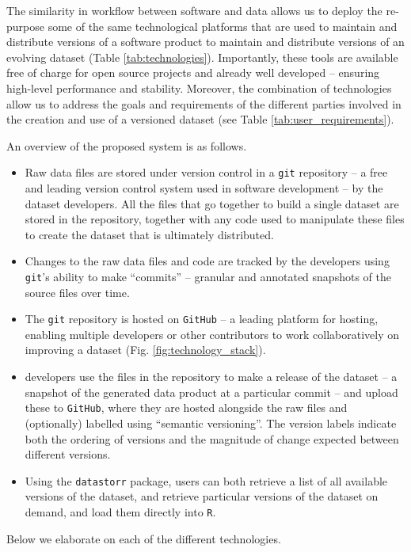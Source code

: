 \documentclass[a4paper,num-refs]{assets/oup-contemporary}
\begin{document}
The similarity in workflow between software and data allows us to deploy the re-purpose some of the same technological platforms that are used to maintain and distribute versions of a software product to maintain and distribute versions of an evolving dataset (Table \ref{tab:technologies}). Importantly, these tools are available free of charge for open source projects and already well developed -- ensuring high-level performance and stability. Moreover, the combination of technologies allow us to address the goals and requirements of the different parties involved in the creation and use of a versioned dataset (see Table \ref{tab:user_requirements}). 

An overview of the proposed system is as follows.
\begin{itemize}
  \item Raw data files are stored under version control in a \texttt{git} repository --  a free and leading version control system used in software development -- by the dataset developers. All the files that go together to build a single dataset are stored in the repository, together with any code used to manipulate these files to create the dataset that is ultimately distributed.
  \item Changes to the raw data files and code are tracked by the developers using  \texttt{git}'s ability to make ``commits'' -- granular and annotated snapshots of the source files over time.
  \item The \texttt{git} repository is hosted on \texttt{GitHub} -- a leading platform for hosting, enabling multiple developers or other contributors to work collaboratively on improving a dataset (Fig. \ref{fig:technology_stack}).
  \item developers use the files in the repository to make a release of the dataset -- a snapshot of the generated data product at a particular commit -- and upload these to \texttt{GitHub}, where they are hosted alongside the raw files and (optionally) labelled using ``semantic versioning''. The version labels indicate both the ordering of versions and the magnitude of change expected between different versions.
  \item Using the \texttt{datastorr} package, users can both retrieve a list of all available versions of the dataset, and retrieve particular versions of the dataset on demand, and load them directly into \texttt{R}. 
\end{itemize}

Below we elaborate on each of the different technologies.
\end{document}
